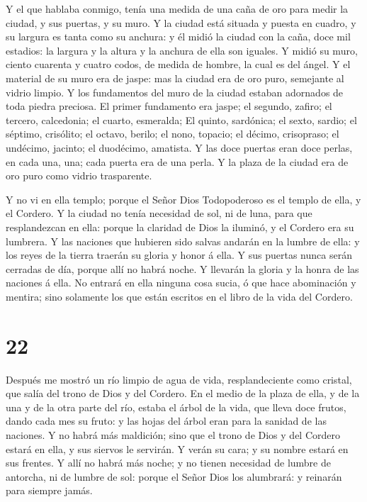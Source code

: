  Y el que hablaba conmigo, tenía una medida de una caña de
oro para medir la ciudad, y sus puertas, y su muro.  Y la
ciudad está situada y puesta en cuadro, y su largura es tanta como su
anchura: y él midió la ciudad con la caña, doce mil estadios: la largura
y la altura y la anchura de ella son iguales.  Y midió su
muro, ciento cuarenta y cuatro codos, de medida de hombre, la cual es
del ángel.  Y el material de su muro era de jaspe: mas la
ciudad era de oro puro, semejante al vidrio limpio.  Y los
fundamentos del muro de la ciudad estaban adornados de toda piedra
preciosa. El primer fundamento era jaspe; el segundo, zafiro; el
tercero, calcedonia; el cuarto, esmeralda;  El quinto,
sardónica; el sexto, sardio; el séptimo, crisólito; el octavo, berilo;
el nono, topacio; el décimo, crisopraso; el undécimo, jacinto; el
duodécimo, amatista.  Y las doce puertas eran doce perlas,
en cada una, una; cada puerta era de una perla. Y la plaza de la ciudad
era de oro puro como vidrio trasparente.

 Y no vi en ella templo; porque el Señor Dios Todopoderoso
es el templo de ella, y el Cordero.  Y la ciudad no tenía
necesidad de sol, ni de luna, para que resplandezcan en ella: porque la
claridad de Dios la iluminó, y el Cordero era su lumbrera. 
Y las naciones que hubieren sido salvas andarán en la lumbre de ella: y
los reyes de la tierra traerán su gloria y honor á ella.  Y
sus puertas nunca serán cerradas de día, porque allí no habrá noche.
 Y llevarán la gloria y la honra de las naciones á ella.
 No entrará en ella ninguna cosa sucia, ó que hace
abominación y mentira; sino solamente los que están escritos en el libro
de la vida del Cordero.

\hypertarget{section-21}{%
\section{22}\label{section-21}}

 Después me mostró un río limpio de agua de vida,
resplandeciente como cristal, que salía del trono de Dios y del Cordero.
 En el medio de la plaza de ella, y de la una y de la otra
parte del río, estaba el árbol de la vida, que lleva doce frutos, dando
cada mes su fruto: y las hojas del árbol eran para la sanidad de las
naciones.  Y no habrá más maldición; sino que el trono de
Dios y del Cordero estará en ella, y sus siervos le servirán.
 Y verán su cara; y su nombre estará en sus frentes.
 Y allí no habrá más noche; y no tienen necesidad de lumbre
de antorcha, ni de lumbre de sol: porque el Señor Dios los alumbrará: y
reinarán para siempre jamás.

